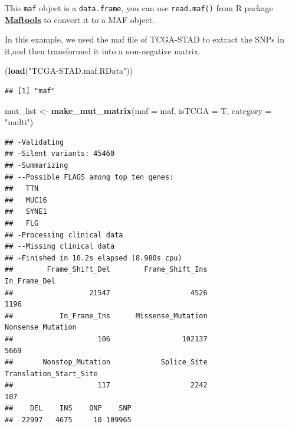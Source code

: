 \documentclass[
  12pt,
]{book}
\newenvironment{Shaded}{\begin{snugshade}}{\end{snugshade}}
\newcommand{\AttributeTok}[1]{\textcolor[rgb]{0.13,0.29,0.53}{#1}}
\newcommand{\FunctionTok}[1]{\textcolor[rgb]{0.13,0.29,0.53}{\textbf{#1}}}
\newcommand{\NormalTok}[1]{#1}
\newcommand{\OtherTok}[1]{\textcolor[rgb]{0.56,0.35,0.01}{#1}}
\newcommand{\SpecialCharTok}[1]{\textcolor[rgb]{0.81,0.36,0.00}{\textbf{#1}}}
\newcommand{\StringTok}[1]{\textcolor[rgb]{0.31,0.60,0.02}{#1}}
\begin{document}
This \texttt{maf} object is a \texttt{data.frame}, you can use \texttt{read.maf()} from R package \textbf{\href{https://github.com/PoisonAlien/maftools}{Maftools}} to convert it to a MAF object.

In this example, we used the maf file of TCGA-STAD to extract the SNPs in it,and then transformed it into a non-negative matrix.

\begin{Shaded}
\begin{Highlighting}[]
\NormalTok{(}\FunctionTok{load}\NormalTok{(}\StringTok{"TCGA{-}STAD.maf.RData"}\NormalTok{))}
\end{Highlighting}
\end{Shaded}

\begin{verbatim}
## [1] "maf"
\end{verbatim}

\begin{Shaded}
\begin{Highlighting}[]
\NormalTok{mut\_list }\OtherTok{\textless{}{-}} \FunctionTok{make\_mut\_matrix}\NormalTok{(}\AttributeTok{maf =}\NormalTok{ maf, }\AttributeTok{isTCGA   =}\NormalTok{ T, }\AttributeTok{category =} \StringTok{"multi"}\NormalTok{)}
\end{Highlighting}
\end{Shaded}

\begin{verbatim}
## -Validating
## -Silent variants: 45460 
## -Summarizing
## --Possible FLAGS among top ten genes:
##   TTN
##   MUC16
##   SYNE1
##   FLG
## -Processing clinical data
## --Missing clinical data
## -Finished in 10.2s elapsed (8.980s cpu) 
##        Frame_Shift_Del        Frame_Shift_Ins           In_Frame_Del 
##                  21547                   4526                   1196 
##           In_Frame_Ins      Missense_Mutation      Nonsense_Mutation 
##                    106                 102137                   5669 
##       Nonstop_Mutation            Splice_Site Translation_Start_Site 
##                    117                   2242                    107 
##    DEL    INS    ONP    SNP 
##  22997   4675     10 109965
\end{verbatim}

\begin{Shaded}
\end{Shaded}
\end{document}
